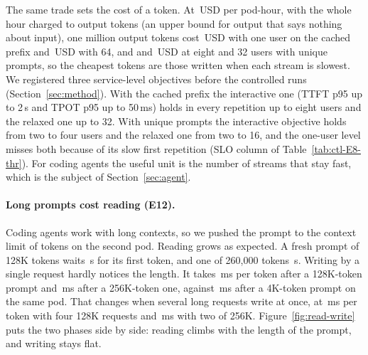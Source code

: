 

The same trade sets the cost of a token. At \,USD per pod-hour, with the whole hour charged
to output tokens (an upper bound for output that says nothing about input), one million output tokens cost
\,USD with one user on the cached prefix and
\,USD with 64, and 
and \,USD at eight and 32 users with unique prompts, so the
cheapest tokens are those written when each stream is slowest. We registered three service-level objectives before
the controlled runs (Section~\ref{sec:method}). With the cached prefix the interactive one (TTFT p95 up to 2\,s and
TPOT p95 up to 50\,ms) holds in every repetition up to eight users and the relaxed one up to 32. With unique prompts
the interactive objective holds from two to four users and the relaxed one from two to 16, and the one-user level
misses both because of its slow first repetition (SLO column of Table~\ref{tab:ctl-E8-thr}). For coding agents the useful unit is the number of streams that stay fast, which is the
subject of Section~\ref{sec:agent}.\label{sec:cost}

\paragraph{Long prompts cost reading (E12).}
Coding agents work with long contexts, so we pushed the prompt to the context limit of
 tokens on the second pod. Reading grows as expected. A fresh prompt of 128K tokens waits
\,s for its first token, and one of 260,000 tokens
\,s. Writing by a single request hardly notices the length. It
takes \,ms per token after a 128K-token prompt and
\,ms after a 256K-token one, against
\,ms after a 4K-token prompt on the same pod. That changes
when several long requests write at once, at \,ms per token with
four 128K requests and \,ms with two of 256K.
Figure~\ref{fig:read-write} puts the two phases side by side: reading climbs with the length of the prompt, and
writing stays flat.

